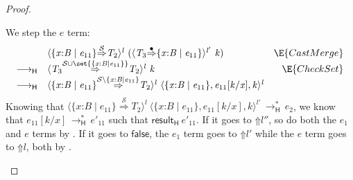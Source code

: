 \documentclass[9pt]{extarticle}
\newcommand{\ottnt}[1]{\mathit{#1}}
\begin{document}
{\begin{lemma}
\begin{proof}
{\begin{itemize}
      We step the $\ottnt{e}$ term:
\[ \begin{array}{rlr}
        &  \langle   \{ \mathit{x} \mathord{:} \ottnt{B} \mathrel{\mid} \ottnt{e_{{\mathrm{11}}}} \}   \mathord{ \overset{ \mathcal{S} }{\Rightarrow} }  \ottnt{T_{{\mathrm{2}}}}  \rangle^{ \ottnt{l} } ~   (  \langle  \ottnt{T_{{\mathrm{3}}}}  \mathord{ \overset{\bullet}{\Rightarrow} }   \{ \mathit{x} \mathord{:} \ottnt{B} \mathrel{\mid} \ottnt{e_{{\mathrm{11}}}} \}   \rangle^{ \ottnt{l'} } ~  \ottnt{k}  )   & \E{CastMerge} \\
         \longrightarrow _{  \mathsf{H}  }  &  \langle  \ottnt{T_{{\mathrm{3}}}}  \mathord{ \overset{  \mathcal{S}  \cup   \set{   \{ \mathit{x} \mathord{:} \ottnt{B} \mathrel{\mid} \ottnt{e_{{\mathrm{11}}}} \}   }   }{\Rightarrow} }  \ottnt{T_{{\mathrm{2}}}}  \rangle^{ \ottnt{l} } ~  \ottnt{k}  & \E{CheckSet} \\
         \longrightarrow _{  \mathsf{H}  }  &  \langle   \{ \mathit{x} \mathord{:} \ottnt{B} \mathrel{\mid} \ottnt{e_{{\mathrm{11}}}} \}   \mathord{ \overset{  \mathcal{S}  \setminus   \{ \mathit{x} \mathord{:} \ottnt{B} \mathrel{\mid} \ottnt{e_{{\mathrm{11}}}} \}   }{\Rightarrow} }  \ottnt{T_{{\mathrm{2}}}}  \rangle^{ \ottnt{l} } ~   \langle   \{ \mathit{x} \mathord{:} \ottnt{B} \mathrel{\mid} \ottnt{e_{{\mathrm{11}}}} \}  ,   \ottnt{e_{{\mathrm{11}}}}  [  \ottnt{k} / \mathit{x}  ]  ,  \ottnt{k}  \rangle^{ \ottnt{l} }   &
      \end{array} \]
Knowing that $ \langle   \{ \mathit{x} \mathord{:} \ottnt{B} \mathrel{\mid} \ottnt{e_{{\mathrm{11}}}} \}   \mathord{ \overset{ \mathcal{S} }{\Rightarrow} }  \ottnt{T_{{\mathrm{2}}}}  \rangle^{ \ottnt{l} } ~   \langle   \{ \mathit{x} \mathord{:} \ottnt{B} \mathrel{\mid} \ottnt{e_{{\mathrm{11}}}} \}  ,   \ottnt{e_{{\mathrm{11}}}}  [  \ottnt{k} / \mathit{x}  ]  ,  \ottnt{k}  \rangle^{ \ottnt{l'} }   \,  \longrightarrow ^{*}_{  \mathsf{H}  }  \, \ottnt{e_{{\mathrm{2}}}}$, we know that $ \ottnt{e_{{\mathrm{11}}}}  [  \ottnt{k} / \mathit{x}  ]  \,  \longrightarrow ^{*}_{  \mathsf{H}  }  \, \ottnt{e'_{{\mathrm{11}}}}$ such that
      $ \mathsf{result} _{  \mathsf{H}  }~ \ottnt{e'_{{\mathrm{11}}}} $.
If it goes to $ \mathord{\Uparrow}  \ottnt{l''} $, so do both the $\ottnt{e_{{\mathrm{1}}}}$ and
      $\ottnt{e}$ terms by .  If it goes to $ \mathsf{false} $, the
      $\ottnt{e_{{\mathrm{1}}}}$ term goes to $ \mathord{\Uparrow}  \ottnt{l'} $ while the $\ottnt{e}$ term
      goes to $ \mathord{\Uparrow}  \ottnt{l} $, both by .

\end{itemize}}
\end{proof}
\end{lemma}}
\end{document}
